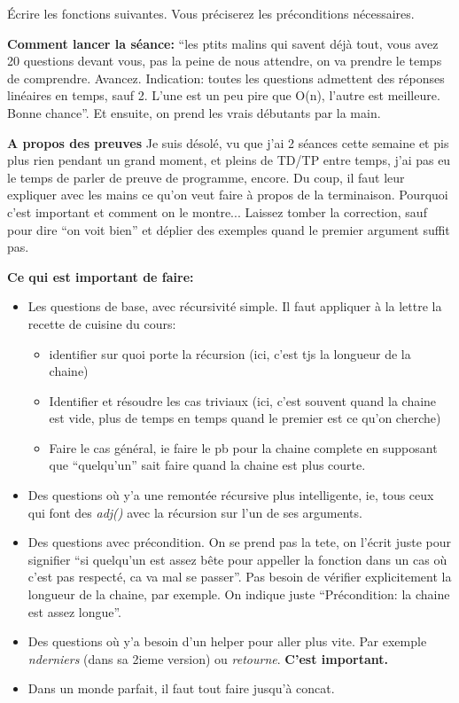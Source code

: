 \documentclass[10pt]{article}\usepackage[correction,nu]{esial}
\begin{document}
\noindent Écrire les fonctions suivantes. Vous préciserez les préconditions
nécessaires.

\begin{Reponse}
  \textbf{Comment lancer la séance:} ``les ptits malins qui savent
  déjà tout, vous avez 20 questions devant vous, pas la peine de nous attendre,
  on va prendre le temps de comprendre. Avancez. Indication: toutes les
  questions admettent des réponses linéaires en temps, sauf 2. L'une est un peu
  pire que O(n), l'autre est meilleure. Bonne chance''. Et ensuite, on prend
  les vrais débutants par la main.

  \textbf{A propos des preuves}
  Je suis désolé, vu que j'ai 2 séances cette semaine et pis plus rien pendant
  un grand moment, et pleins de TD/TP entre temps, j'ai pas eu le temps de
  parler de preuve de programme, encore. Du coup, il faut leur expliquer avec
  les mains ce qu'on veut faire à propos de la terminaison. Pourquoi c'est
  important et comment on le montre... Laissez tomber la correction, sauf pour
  dire ``on voit bien'' et déplier des exemples quand le premier argument
  suffit pas.

  \textbf{Ce qui est important de faire:}
  \begin{itemize}
  \item Les questions de base, avec récursivité simple. Il faut appliquer à la
    lettre la recette de cuisine du cours:
    \begin{itemize}
    \item identifier sur quoi porte la récursion (ici, c'est tjs la longueur de
      la chaine)
    \item Identifier et résoudre les cas triviaux (ici, c'est souvent quand la
      chaine est vide, plus de temps en temps quand le premier est ce qu'on
      cherche)
    \item Faire le cas général, ie faire le pb pour la chaine complete en
      supposant que ``quelqu'un'' sait faire quand la chaine est plus courte.
    \end{itemize}
  \item Des questions où y'a une remontée récursive plus intelligente, ie, tous
    ceux qui font des \textit{adj()} avec la récursion sur l'un de ses
    arguments.
  \item Des questions avec précondition. On se prend pas la tete, on l'écrit
    juste pour signifier ``si quelqu'un est assez bête pour appeller la
    fonction dans un cas où c'est pas respecté, ca va mal se passer''. Pas
    besoin de vérifier explicitement la longueur de la chaine, par exemple. On
    indique juste ``Précondition: la chaine est assez longue''.
  \item Des questions où y'a besoin d'un helper pour aller plus vite. Par
    exemple \textit{nderniers} (dans sa 2ieme version) ou
    \textit{retourne}. \textbf{C'est important.}
  \item Dans un monde parfait, il faut tout faire jusqu'à concat.
  \end{itemize}


\end{Reponse}
\end{document}
